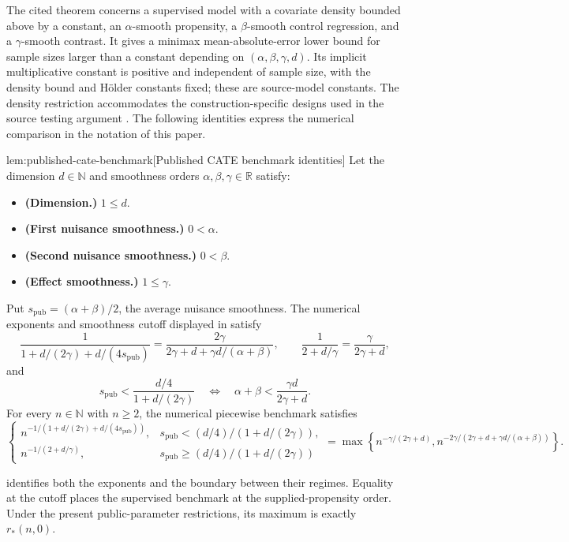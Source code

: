 The cited theorem concerns a supervised model with a covariate density bounded above by a constant, an \(\alpha\)-smooth propensity, a \(\beta\)-smooth control regression, and a \(\gamma\)-smooth contrast. It gives a minimax mean-absolute-error lower bound for sample sizes larger than a constant depending on \((\alpha,\beta,\gamma,d)\). Its implicit multiplicative constant is positive and independent of sample size, with the density bound and H\"older constants fixed; these are source-model constants. The density restriction accommodates the construction-specific designs used in the source testing argument \citep[Section 3.1]{KennedyBalakrishnanRobinsWasserman2024}. The following identities express the numerical comparison in the notation of this paper.

\begin{lemmav}{lem:published-cate-benchmark}[Published CATE benchmark identities]
Let the dimension \(d\in\mathbb N\) and smoothness orders \(\alpha,\beta,\gamma\in\mathbb R\) satisfy:
\begin{itemize}
\item \textbf{(Dimension.)} \(1\le d\).
\item \textbf{(First nuisance smoothness.)} \(0<\alpha\).
\item \textbf{(Second nuisance smoothness.)} \(0<\beta\).
\item \textbf{(Effect smoothness.)} \(1\le\gamma\).
\end{itemize}
Put \(s_{\mathrm{pub}}=(\alpha+\beta)/2\), the average nuisance smoothness. The numerical exponents and smoothness cutoff displayed in \citet[Section 3, Theorem 1]{KennedyBalakrishnanRobinsWasserman2024} satisfy
\[
\frac{1}{1+d/(2\gamma)+d/(4s_{\mathrm{pub}})}
=\frac{2\gamma}{2\gamma+d+\gamma d/(\alpha+\beta)},
\qquad
\frac{1}{2+d/\gamma}=\frac{\gamma}{2\gamma+d},
\]
and
\[
s_{\mathrm{pub}}<\frac{d/4}{1+d/(2\gamma)}
\quad\Longleftrightarrow\quad
\alpha+\beta<\frac{\gamma d}{2\gamma+d}.
\]
For every \(n\in\mathbb N\) with \(n\ge2\), the numerical piecewise benchmark satisfies
\[
\begin{cases}
n^{-1/(1+d/(2\gamma)+d/(4s_{\mathrm{pub}}))},
& s_{\mathrm{pub}}<(d/4)/(1+d/(2\gamma)),\\
n^{-1/(2+d/\gamma)},
& s_{\mathrm{pub}}\ge(d/4)/(1+d/(2\gamma))
\end{cases}
=
\max\left\{
n^{-\gamma/(2\gamma+d)},
n^{-2\gamma/(2\gamma+d+\gamma d/(\alpha+\beta))}
\right\}.
\]
\end{lemmav}

 identifies both the exponents and the boundary between their regimes. Equality at the cutoff places the supervised benchmark at the supplied-propensity order. Under the present public-parameter restrictions, its maximum is exactly \(r_*(n,0)\).

